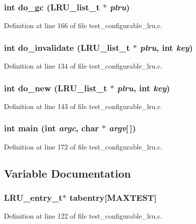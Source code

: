\subsubsection[{do\_\-gc}]{\setlength{\rightskip}{0pt plus 5cm}int do\_\-gc (LRU\_\-list\_\-t $\ast$ {\em plru})}\label{test__configurable__lru_8c_69fb1ec85a72456d2eaa23d63156d54d}




Definition at line 166 of file test\_\-configurable\_\-lru.c.
\subsubsection[{do\_\-invalidate}]{\setlength{\rightskip}{0pt plus 5cm}int do\_\-invalidate (LRU\_\-list\_\-t $\ast$ {\em plru}, \/  int {\em key})}\label{test__configurable__lru_8c_8e17dac3023565c5bd97b43488ab7f3d}




Definition at line 134 of file test\_\-configurable\_\-lru.c.
\subsubsection[{do\_\-new}]{\setlength{\rightskip}{0pt plus 5cm}int do\_\-new (LRU\_\-list\_\-t $\ast$ {\em plru}, \/  int {\em key})}\label{test__configurable__lru_8c_95d0189529916fad0da728ba589c3b4c}




Definition at line 143 of file test\_\-configurable\_\-lru.c.
\subsubsection[{main}]{\setlength{\rightskip}{0pt plus 5cm}int main (int {\em argc}, \/  char $\ast$ {\em argv}[$\,$])}\label{test__configurable__lru_8c_0ddf1224851353fc92bfbff6f499fa97}




Definition at line 172 of file test\_\-configurable\_\-lru.c.

\subsection{Variable Documentation}
\subsubsection[{tabentry}]{\setlength{\rightskip}{0pt plus 5cm}LRU\_\-entry\_\-t$\ast$ {\bf tabentry}[MAXTEST]}\label{test__configurable__lru_8c_4708db27e214130ba35e65dd4b740156}




Definition at line 122 of file test\_\-configurable\_\-lru.c.